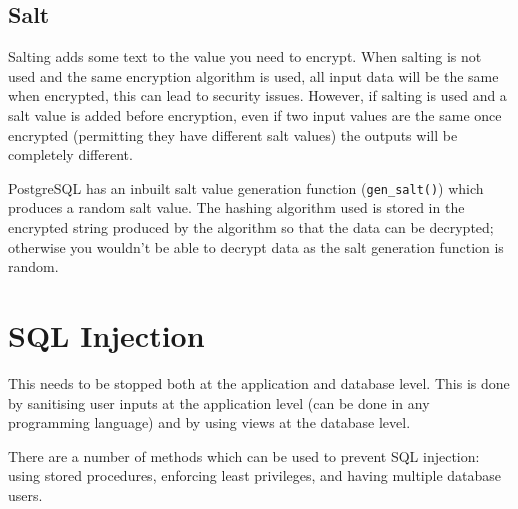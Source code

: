 \subsection*{Salt}
Salting adds some text to the value you need to encrypt. When salting is not used and the same encryption algorithm is used, all input data will be the same when encrypted, this can lead to security issues. However, if salting is used and a salt value is added before encryption, even if two input values are the same once encrypted (permitting they have different salt values) the outputs will be completely different.

PostgreSQL has an inbuilt salt value generation function (\texttt{gen\_salt()}) which produces a random salt value. The hashing algorithm used is stored in the encrypted string produced by the algorithm so that the data can be decrypted; otherwise you wouldn't be able to decrypt data as the salt generation function is random. 

\section*{SQL Injection}
This needs to be stopped both at the application and database level. This is done by sanitising user inputs at the application level (can be done in any programming language) and by using views at the database level. 

There are a number of methods which can be used to prevent SQL injection: using stored procedures, enforcing least privileges, and having multiple database users. 